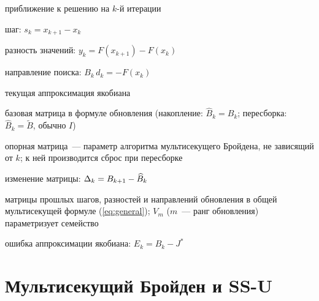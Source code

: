 \begin{description}[leftmargin=5.5em,labelwidth=5em,labelindent=0pt,font=\normalfont]
  \item[$x_k$]      приближение к решению на $k$-й итерации
  \item[$s_k$]      шаг: $s_k = x_{k+1} - x_k$
  \item[$y_k$]      разность значений: $y_k = F(x_{k+1}) - F(x_k)$
  \item[$d_k$]      направление поиска: $B_k\,d_k = -F(x_k)$
  \item[$B_k$]      текущая аппроксимация якобиана
  \item[$\widehat{B}_k$] базовая матрица в формуле обновления
                    (накопление: $\widehat{B}_k = B_k$; пересборка:
                    $\widehat{B}_k = \widetilde{B}$, обычно $I$)
  \item[$\widetilde{B}$] опорная матрица~--- параметр алгоритма
                    мультисекущего Бройдена, не зависящий от $k$;
                    к ней производится сброс при пересборке
  \item[$\Delk$]    изменение матрицы: $\Delta_{k} = B_{k+1} - \widehat{B}_k$
  \item[$S_m,\, Y_m,\, V_m$]
                    матрицы прошлых шагов, разностей и направлений
                    обновления в общей мультисекущей формуле
                    (\ref{eq:general}); $V_m$ ($m$~--- ранг обновления)
                    параметризует семейство
  \item[$E_k$]      ошибка аппроксимации якобиана: $E_k = B_k - J^*$
\end{description}

\section*{Мультисекущий Бройден и SS-U}

